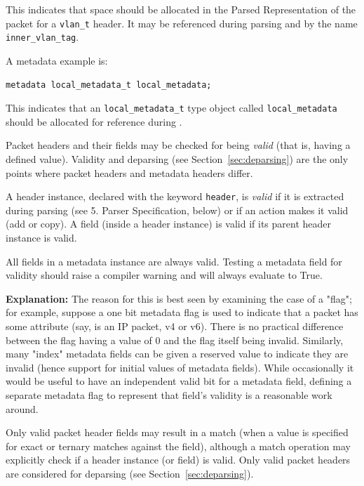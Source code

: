 \documentclass[12pt]{article}
\begin{document}
This indicates that space should be allocated in the Parsed
Representation of the packet for a \texttt{vlan_t} header. It may be
referenced during parsing and \matchaction by the name
\texttt{inner_vlan_tag}.

A metadata example is:

\begin{lstlisting}[keywords={},frame=single,escapechar=\@]
metadata local_metadata_t local_metadata;
\end{lstlisting}

This indicates that an \texttt{local_metadata_t} type object called
\texttt{local_metadata} should be allocated for reference during
\matchaction.  


Packet headers and their fields may be checked for being
\textit{valid} (that is, having a defined value). Validity and
deparsing (see Section~\ref{sec:deparsing}) are the only points where packet
headers and metadata headers differ.

A header instance, declared with the keyword \texttt{header}, is
\textit{valid} if it is extracted during parsing (see 5. Parser
Specification, below) or if an action makes it valid (add or copy). A
field (inside a header instance) is valid if its parent header
instance is valid.

All fields in a metadata instance are always valid.  Testing a
metadata field for validity should raise a compiler warning and will
always evaluate to True.

\begin{adjustwidth}{1.5cm}{1.5cm}
\textbf{Explanation: } The reason for this is best seen by examining
the case of a "flag"; for example, suppose a one bit metadata flag is
used to indicate that a packet has some attribute (say, is an IP
packet, v4 or v6).  There is no practical difference between the flag
having a value of 0 and the flag itself being invalid.  Similarly,
many "index" metadata fields can be given a reserved value to indicate
they are invalid (hence support for initial values of metadata
fields).  While occasionally it would be useful to have an independent
valid bit for a metadata field, defining a separate metadata flag to
represent that field's validity is a reasonable work around.
\end{adjustwidth}

Only valid packet header fields may result in a match (when a value is
specified for exact or ternary matches against the field), although a
match operation may explicitly check if a header instance (or field)
is valid. Only valid packet headers are considered for deparsing (see
Section~\ref{sec:deparsing}).  
\end{document}
